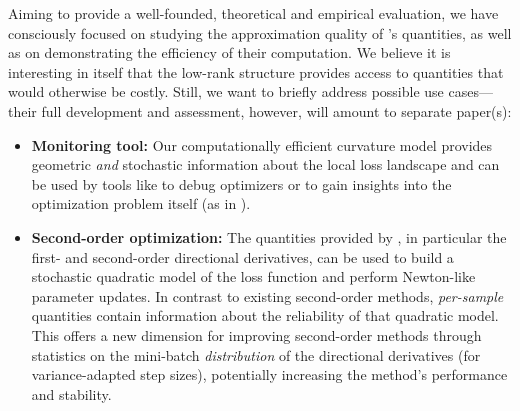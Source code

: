 Aiming to provide a well-founded, theoretical and empirical evaluation, we have
consciously focused on studying the approximation quality of \vivit's
quantities, as well as on demonstrating the efficiency of their computation. We
believe it is interesting in itself that the low-rank structure provides access
to quantities that would otherwise be costly. Still, we want to briefly address
possible use cases---their full development and assessment, however, will amount
to separate paper(s):
\begin{itemize}
\item \textbf{Monitoring tool:} Our computationally efficient curvature model
  provides geometric \textit{and} stochastic information about the local loss
  landscape and can be used by tools like \cockpit \citep{schneider2021cockpit}
  to debug optimizers or to gain insights into the optimization problem itself
  (as in ).

\item \textbf{Second-order optimization:} The quantities provided by \vivit{},
  in particular the first- and second-order directional derivatives, can be used
  to build a stochastic quadratic model of the loss function and perform
  Newton-like parameter updates. In contrast to existing second-order methods,
  \textit{per-sample} quantities contain information about the reliability of
  that quadratic model. This offers a new dimension for improving second-order
  methods through statistics on the mini-batch \textit{distribution} of the
  directional derivatives (\eg for variance-adapted step sizes), potentially
  increasing the method's performance and stability.
\end{itemize}

